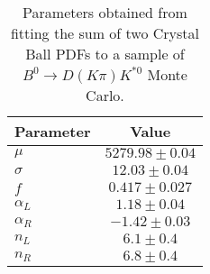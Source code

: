 \begin{table}[h]
  \centering
  \begin{tabular}{lc}
      \toprule
      Parameter & Value \\
      \midrule
      $\mu$ & $5279.98 \pm 0.04$ \\
      $\sigma$ & $12.03 \pm 0.04$ \\
      $f$ & $0.417 \pm 0.027$ \\
      $\alpha_L$ & $1.18 \pm 0.04$ \\
      $\alpha_R$ & $-1.42 \pm 0.03$ \\
      $n_L$ & $6.1 \pm 0.4$ \\
      $n_R$ & $6.8 \pm 0.4$ \\
  \bottomrule
  \end{tabular}
  \caption{Parameters obtained from fitting the sum of two Crystal Ball PDFs to a sample of $B^0 \to D(K\pi)K^{*0}$ Monte Carlo.}
\label{tab:signal_Kpi_MC_params}
\end{table}
